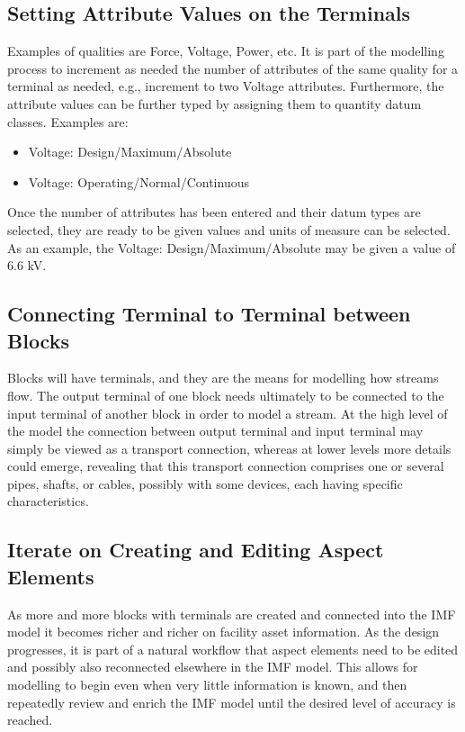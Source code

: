 \documentclass[../main.tex]{subfiles}
\begin{document}
\subsection{Setting Attribute Values on the Terminals}
Examples of qualities are Force, Voltage, Power, etc. It is part of the modelling 
process to increment as needed the number of attributes of the same quality for a terminal as needed, e.g., increment
to two Voltage attributes. Furthermore, the attribute values can be further typed by assigning them to quantity datum
classes. Examples are:

\begin{itemize}
  \item Voltage: Design/Maximum/Absolute
  \item Voltage: Operating/Normal/Continuous
\end{itemize}
Once the number of attributes has been entered and their datum types are selected, they are ready to be given values
and units of measure can be selected. As an example, the Voltage: Design/Maximum/Absolute may be given a value of 6.6
kV.

\subsection{Connecting Terminal to Terminal between
  Blocks}
Blocks will have terminals, and they are the means for modelling how streams flow.
The output terminal of one block needs ultimately to be connected to the input terminal of another block
 in order to model a stream. At the high level of the model the connection between output terminal and input terminal may simply
be viewed as a transport connection, whereas at lower levels more details could emerge, revealing that this transport
connection comprises one or several pipes, shafts, or cables, possibly with some devices, each having specific
characteristics.

\subsection{Iterate on Creating and Editing Aspect Elements}
As more and more blocks with terminals are created and connected into the IMF model it becomes
richer and richer on facility asset information. As the design progresses, it is part of a natural workflow that
aspect elements need to be edited and possibly also reconnected elsewhere in the IMF model. 
This allows for modelling to begin even when very little information is known, and then repeatedly
review and enrich the IMF model until the desired level of accuracy is reached.
\end{document}
